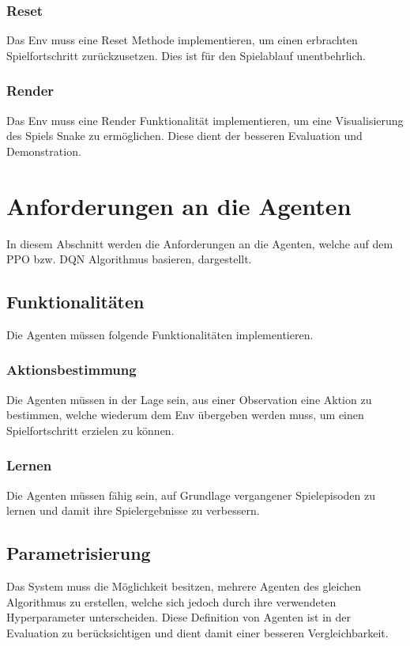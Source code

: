 \subsubsection{Reset} \label{subsubsec:Anforderungen_Reset}
Das Env muss eine Reset Methode implementieren, um einen erbrachten Spielfortschritt zurückzusetzen. Dies ist für den Spielablauf unentbehrlich.

\subsubsection{Render} \label{subsubsec:Anforderungen_Render}
Das Env muss eine Render Funktionalität implementieren, um eine Visualisierung des Spiels Snake zu ermöglichen. Diese dient der besseren Evaluation und Demonstration.

\section{Anforderungen an die Agenten} \label{sec:Anforderungen_Agenten}
In diesem Abschnitt werden die Anforderungen an die Agenten, welche auf dem PPO bzw. DQN Algorithmus basieren, dargestellt.

\subsection{Funktionalitäten} \label{subsec:Anforderungen_Funktionalitäten_Agent}
Die Agenten müssen folgende Funktionalitäten implementieren.

\subsubsection{Aktionsbestimmung} \label{subsubsec:Anforderungen_Aktionsbestimmung}
Die Agenten müssen in der Lage sein, aus einer Observation eine Aktion zu bestimmen, welche wiederum dem Env übergeben werden muss, um einen Spielfortschritt erzielen zu können.

\subsubsection{Lernen} \label{subsubsec:Anforderungen_Lernen}
Die Agenten müssen fähig sein, auf Grundlage vergangener Spielepisoden zu lernen und damit ihre Spielergebnisse zu verbessern.

\subsection{Parametrisierung} \label{subsec:Anforderungen_Parametrisierung}
Das System muss die Möglichkeit besitzen, mehrere Agenten des gleichen Algorithmus zu erstellen, welche sich jedoch durch ihre verwendeten Hyperparameter unterscheiden. Diese Definition von Agenten ist in der Evaluation zu berücksichtigen und dient damit einer besseren Vergleichbarkeit.


